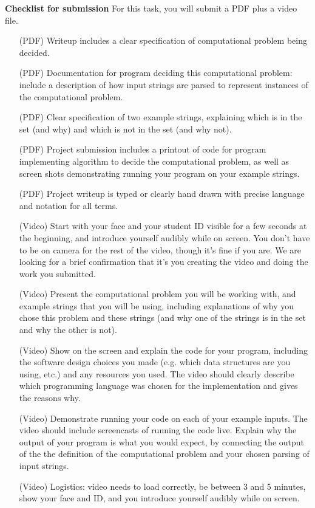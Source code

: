 \documentclass[12pt, oneside]{article}
\begin{document}
\newpage
{\bf Checklist for submission} For this task, you will submit a PDF plus a video file.

\vspace{-10pt}

\begin{itemize}
   \item[(PDF)] Writeup includes a clear specification of computational problem being decided.
   \item[(PDF)] Documentation for program deciding this computational problem: 
   include a description of how input strings are parsed to represent
   instances of the computational problem.
   \item[(PDF)] Clear specification of two example strings, explaining which is in the set (and why) and which is not in the set (and why not).
   \item[(PDF)] Project submission includes a printout of code for program implementing algorithm to decide the computational problem, as well as screen shots demonstrating running your program on your 
   example strings.
   \item[(PDF)] Project writeup is typed or clearly hand drawn with precise language and notation for all terms.
   \item[(Video)] Start with your face and your student ID visible for a few seconds at the beginning, and introduce yourself audibly while on screen. You don't have to be on camera for the  rest of the video, though it's fine if you are. We are looking for a brief confirmation that  it's you creating the video and doing the work you submitted.
\item[(Video)] Present the computational problem you will be working with, and 
example strings that you will be using, including explanations of why you chose this problem and these strings (and why one of the strings is in the set 
and why the other is not).
\item[(Video)] Show on the screen and explain the code for your program, including the software design choices you made
(e.g. which data structures are you using, etc.) and any resources you used. The video 
should clearly describe which programming language was chosen 
for the implementation and gives the reasons why.
\item[(Video)] Demonstrate running your code on each of your example inputs. The video should include screencasts of 
running the code live.
Explain why the output of your program is what you would expect, by connecting the output of the the definition of the computational problem and your chosen parsing of input strings.
\item[(Video)] Logistics: video needs to load correctly, be between 3 and 5 minutes, 
show your face and ID, and you introduce yourself 
audibly while on screen.
\end{itemize}
\end{document}
